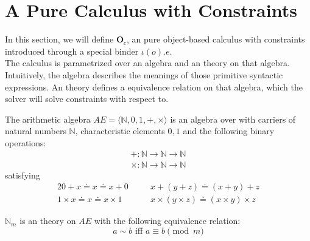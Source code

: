 \section{A Pure Calculus with Constraints}

In this section, we will define $\textbf{O}_c$, an pure object-based calculus with
constraints introduced through a special binder $\iota(o).e$.\\

The calculus is parametrized over an algebra and an theory on that algebra.
Intuitively, the algebra describes the meanings of those primitive syntactic
expressions. An theory defines a equivalence relation on that algebra, which the
solver will solve constraints with respect to.

\begin{exa}
  The arithmetic algebra $AE = \langle \mathbb{N} , 0, 1, +, \times \rangle$ is
  an algebra over with carriers of natural numbers $\mathbb{N}$, characteristic
  elements $0,1$ and the following binary operations:
  \begin{align*}
    +      : \mathbb{N} \to \mathbb{N} \to \mathbb{N}\\
    \times : \mathbb{N} \to \mathbb{N} \to \mathbb{N}
  \end{align*}
  satisfying
  \begin{alignat*}{2}
      0 + x \doteq x \doteq x + 0 \quad && x + (y + z) \doteq (x + y) + z\\
      1 \times x \doteq x \doteq x \times 1 \quad && x \times (y \times z) \doteq (x \times y) \times z
  \end{alignat*}

  $\mathbb{N}_m$ is an theory on $AE$ with the following equivalence relation:
  \[
    a \sim b \text{ iff } a \equiv b \pmod{m}
  \]

\end{exa}

